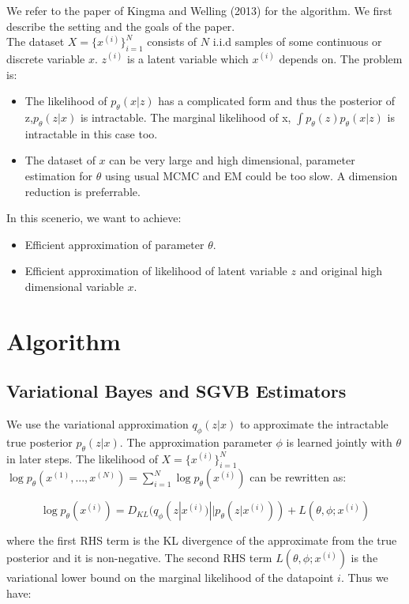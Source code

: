 \documentclass[11pt]{article}
\begin{document}
We refer to the paper of Kingma and Welling (2013) for the algorithm. We first describe the setting and the goals of the paper. \\
The dataset $X = \{x^{(i)}\}^N_{i=1}$ consists of $N$ i.i.d samples of some continuous or discrete variable $x$.  $z^{(i)}$ is a latent variable which $x^{(i)}$ depends on. The problem is: 
\begin{itemize}
\item The likelihood of $p_{\theta}(x|z)$ has a complicated form and thus the posterior of z,$p_{\theta}(z|x)$ is intractable. The marginal likelihood of x, $\int p_{\theta}(z)p_{\theta}(x|z)$ is intractable in this case too.

\item The dataset of $x$ can be very large and high dimensional, parameter estimation for $\theta$ using usual MCMC and EM could be too slow. A dimension reduction is preferrable.
\end{itemize}

In this scenerio, we want to achieve: 
\begin{itemize}
\item Efficient approximation of parameter ${\theta}$.
\item Efficient approximation of likelihood of latent variable $z$ and original high dimensional variable $x$.
\end{itemize}


\section{Algorithm}

\subsection{Variational Bayes and SGVB Estimators} 

We use the variational approximation $q_{\phi}(z|x)$ to approximate the intractable true posterior $p_{\theta}(z|x)$. The approximation parameter $\phi$ is learned jointly with $\theta$ in later steps. The likelihood of  $X = \{x^{(i)}\}^N_{i=1}$ $\log p_\theta(x^{(1)},...,x^{(N)})=\sum^N_{i=1}\log p_\theta(x^{(i)})$ can be rewritten as:

\begin{equation}
\log p_\theta(x^{(i)})=D_{KL}(q_\phi(z|x^{(i)})||p_\theta(z|x^{(i)}))+L(\theta, \phi; x^{(i)})
\end{equation}

where the first RHS term is the KL divergence of the approximate from the true posterior and it is non-negative. The second RHS term $L(\theta, \phi; x^{(i)})$ is the variational lower bound on the marginal likelihood of the datapoint $i$. Thus we have:
\end{document}
